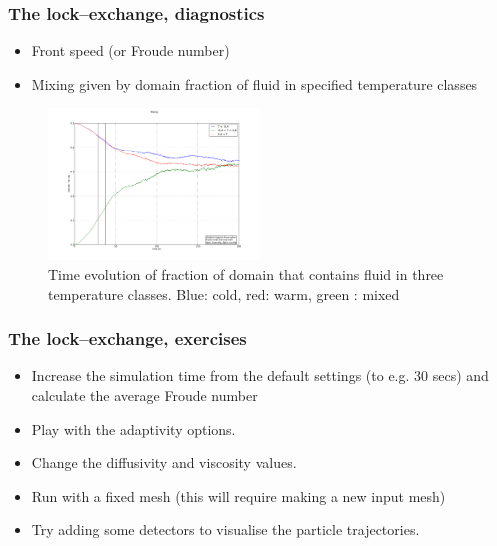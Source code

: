 %
\begin{frame}
    \frametitle{The lock--exchange, diagnostics}
\begin{itemize}
\item Front speed (or Froude number)
\item Mixing given by domain fraction of fluid in specified temperature classes
\end{itemize}

\begin{figure}
\centering
\includegraphics[width=0.5\textwidth]{./lock_exchange/mixing}
\caption{Time evolution of fraction of domain that contains fluid in three temperature classes. Blue: cold, red: warm, green : mixed}
\end{figure}

\end{frame}
%
\begin{frame}
    \frametitle{The lock--exchange, exercises}
\begin{itemize}
\item Increase the simulation time from the default settings (to e.g. 30 secs) and calculate the average Froude number
\item Play with the adaptivity options.
\item Change the diffusivity and viscosity values.
\item Run with a fixed mesh (this will require making a new input mesh)
\item Try adding some detectors to visualise the particle trajectories.
\end{itemize}

\end{frame}
